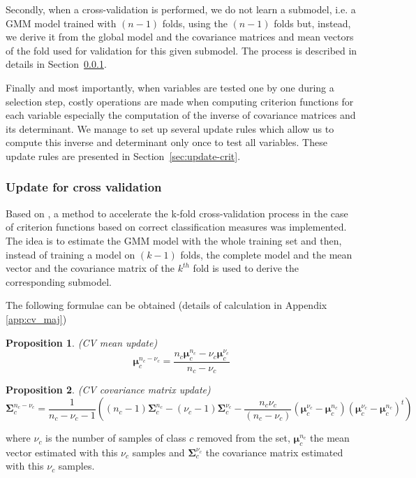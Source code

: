 \documentclass[a4paper,11pt,DIV=16,abstracton]{scrartcl}
\newtheorem{prop}{Proposition}
\begin{document}
    Secondly, when a cross-validation is performed, we do not learn a submodel, i.e. a GMM model trained with $(n-1)$ folds, using the $(n-1)$ folds but, instead, we derive it from the global model and the covariance matrices and mean vectors of the fold used for validation for this given submodel. The process is described in details in Section~\ref{sec:update-cv}.

    Finally and most importantly, when variables are tested one by one during a selection step, costly operations are made when computing criterion functions for each variable especially the computation of the inverse of covariance matrices and its determinant. We manage to set up several update rules which allow us to compute this inverse and determinant only once to test all variables. These update rules are presented in Section~\ref{sec:update-crit}.

        \subsubsection{Update for cross validation}
        \label{sec:update-cv}

        Based on \cite{fauvel2015fast}, a method to accelerate the k-fold cross-validation process in the case of criterion functions based on correct classification measures was implemented. The idea is to estimate the GMM model with the whole training set and then, instead of training a model on $(k-1)$ folds, the complete model and the mean vector and the covariance matrix of the $k^{th}$ fold is used to derive the corresponding submodel.

        The following formulae can be obtained (details of calculation in Appendix \ref{app:cv_maj})
        \begin{prop}
            \label{eq:update-cv1}
            (CV mean update)
            \begin{equation*}
                \boldsymbol{\mu}_c^{n_c-\nu_c} = \frac{n_c \boldsymbol{\mu}_c^{n_c} - \nu_c \boldsymbol{\mu}_c^{\nu_c}}{n_c - \nu_c} \nonumber
            \end{equation*}
        \end{prop}
        \begin{prop}
            \label{eq:update-cv2}
            (CV covariance matrix update)
            \begin{equation*}
                \boldsymbol{\Sigma}_c^{n_c-\nu_c} = \frac{1}{n_c-\nu_c-1} ( (n_c-1) \boldsymbol{\Sigma}_c^{n_c} - (\nu_c-1) \boldsymbol{\Sigma}_c^{\nu_c} - \frac{n_c \nu_c}{(n_c-\nu_c)} (\boldsymbol{\mu}_c^{\nu_c}-\boldsymbol{\mu}_c^{n_c})(\boldsymbol{\mu}_c^{\nu_c}-\boldsymbol{\mu}_c^{n_c})^t) \nonumber
            \end{equation*}
        \end{prop}
        where $\nu_c$ is the number of samples of class $c$ removed from the set, $\boldsymbol{\mu}_c^{n_c}$ the mean vector estimated with this $\nu_c$ samples and $\boldsymbol{\Sigma}_c^{\nu_c}$ the covariance matrix estimated with this $\nu_c$ samples.
\end{document}

